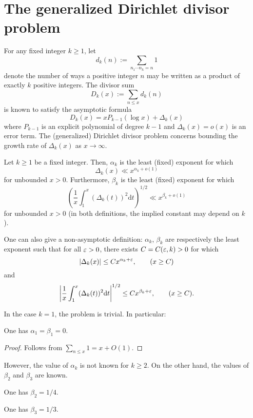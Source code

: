 \chapter{The generalized Dirichlet divisor problem}\label{divisor-chapter}

For any fixed integer $k \ge 1$, let 
\[
d_k(n) := \sum_{n_1 \cdots n_k = n}1
\]
denote the number of ways a positive integer $n$ may be written as a product of exactly $k$ positive integers. The divisor sum
\[
D_k(x) := \sum_{n \leq x} d_k(n)
\]
is known to satisfy the asymptotic formula 
\[
D_k(x) = x P_{k - 1}(\log x) + \Delta_k(x)
\]
where $P_{k - 1}$ is an explicit polynomial of degree $k-1$ and $\Delta_k(x) = o(x)$ is an error term. The (generalized) Dirichlet divisor problem concerns bounding the growth rate of $\Delta_k(x)$ as $x\to\infty$. 

\begin{definition}\label{divisor-def} Let $k \geq 1$ be a fixed integer. Then, $\alpha_k$ is the least (fixed) exponent for which
$$ \Delta_k(x) \ll x^{\alpha_k+o(1)}$$
for unbounded $x > 0$. Furthermore, $\beta_k$ is the least (fixed) exponent for which 
\[
\left(\frac{1}{x}\int_1^x (\Delta_k(t))^2\text{d}t\right)^{1/2} \ll x^{\beta_k + o(1)}
\]
for unbounded $x > 0$ (in both definitions, the implied constant may depend on $k$).
\end{definition}

One can also give a non-asymptotic definition: $\alpha_k$, $\beta_k$ are respectively the least exponent such that for all $\varepsilon > 0$, there exists $C = C(\varepsilon, k) > 0$ for which
\[
|\Delta_k(x)| \leq C x^{\alpha_k + \varepsilon},\qquad (x \ge C)
\]
and
\[
\left|\frac{1}{x}\int_1^x(\Delta_k(t))^2\text{d}t\right|^{1/2} \le Cx^{\beta_k + \varepsilon},\qquad (x \ge C).
\]

In the case $k = 1$, the problem is trivial. In particular:

\begin{lemma}[$d_1$ exponent]\label{divisor-1} One has $\alpha_1=\beta_1=0$.
\end{lemma}
\begin{proof}
Follows from $\sum_{n \le x}1 = x + O(1)$. 
\end{proof}

However, the value of $\alpha_k$ is not known for $k \ge 2$. On the other hand, the values of $\beta_2$ and $\beta_3$ are known.

\begin{theorem}\label{avg-divisor-2} 
One has $\beta_2 = 1/4$.
\end{theorem}
\begin{theorem}\label{avg-divisor-3} 
One has $\beta_3 = 1/3$.
\end{theorem}

